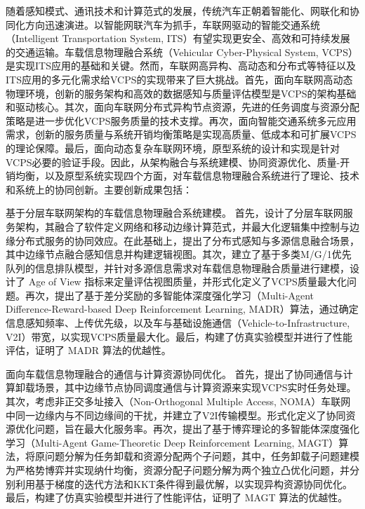\begin{cabstract}	%

随着感知模式、通讯技术和计算范式的发展，传统汽车正朝着智能化、网联化和协同化方向迅速演进。以智能网联汽车为抓手，车联网驱动的智能交通系统（Intelligent Transportation System, ITS）有望实现更安全、高效和可持续发展的交通运输。车载信息物理融合系统（Vehicular Cyber-Physical System, VCPS）是实现ITS应用的基础和关键。然而，车联网高异构、高动态和分布式等特征以及ITS应用的多元化需求给VCPS的实现带来了巨大挑战。首先，面向车联网高动态物理环境，创新的服务架构和高效的数据感知与质量评估模型是VCPS的架构基础和驱动核心。其次，面向车联网分布式异构节点资源，先进的任务调度与资源分配策略是进一步优化VCPS服务质量的技术支撑。再次，面向智能交通系统多元应用需求，创新的服务质量与系统开销均衡策略是实现高质量、低成本和可扩展VCPS的理论保障。最后，面向动态复杂车联网环境，原型系统的设计和实现是针对VCPS必要的验证手段。因此，从架构融合与系统建模、协同资源优化、质量-开销均衡，以及原型系统实现四个方面，对车载信息物理融合系统进行了理论、技术和系统上的协同创新。主要创新成果包括：

 基于分层车联网架构的车载信息物理融合系统建模。
首先，设计了分层车联网服务架构，其融合了软件定义网络和移动边缘计算范式，并最大化逻辑集中控制与边缘分布式服务的协同效应。在此基础上，提出了分布式感知与多源信息融合场景，其中边缘节点融合感知信息并构建逻辑视图。其次，建立了基于多类M/G/1优先队列的信息排队模型，并针对多源信息需求对车载信息物理融合质量进行建模，设计了 Age of View 指标来定量评估视图质量，并形式化定义了VCPS质量最大化问题。再次，提出了基于差分奖励的多智能体深度强化学习（Multi-Agent Difference-Reward-based Deep Reinforcement Learning, MADR）算法，通过确定信息感知频率、上传优先级，以及车与基础设施通信（Vehicle-to-Infrastructure, V2I）带宽，以实现VCPS质量最大化。最后，构建了仿真实验模型并进行了性能评估，证明了 MADR 算法的优越性。

 面向车载信息物理融合的通信与计算资源协同优化。
首先，提出了协同通信与计算卸载场景，其中边缘节点协同调度通信与计算资源来实现VCPS实时任务处理。其次，考虑非正交多址接入（Non-Orthogonal Multiple Access, NOMA）车联网中同一边缘内与不同边缘间的干扰，并建立了V2I传输模型。形式化定义了协同资源优化问题，旨在最大化服务率。再次，提出了基于博弈理论的多智能体深度强化学习（Multi-Agent Game-Theoretic Deep Reinforcement Learning, MAGT）算法，将原问题分解为任务卸载和资源分配两个子问题，其中，任务卸载子问题建模为严格势博弈并实现纳什均衡，资源分配子问题分解为两个独立凸优化问题，并分别利用基于梯度的迭代方法和KKT条件得到最优解，以实现异构资源协同优化。最后，构建了仿真实验模型并进行了性能评估，证明了 MAGT 算法的优越性。


\end{cabstract}
